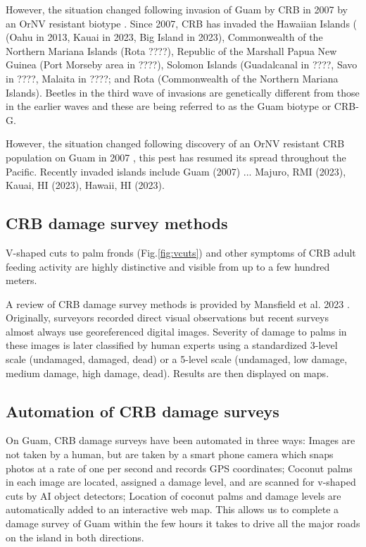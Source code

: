 \documentclass[11pt,english,letterpaper]{scrartcl}
\begin{document}

However, the situation changed following invasion of Guam by CRB in 2007 by an OrNV resistant biotype \cite{Marshall2017}. Since 2007, CRB has invaded the Hawaiian Islands ( (Oahu in 2013, Kauai in 2023, Big Island in 2023), Commonwealth of the Northern Mariana Islands (Rota ????), Republic of the Marshall Papua New Guinea (Port Morseby area in ????), Solomon Islands (Guadalcanal in ????, Savo in ????, Malaita in ????; and Rota (Commonwealth of the Northern Mariana Islands). Beetles in the third wave of invasions are genetically different from those in the earlier waves and these are being referred to as the Guam biotype or CRB-G.



However, the situation changed following discovery of an OrNV resistant CRB population on Guam in 2007 \cite{Marshall2017}, this pest has resumed its spread throughout the Pacific. Recently invaded islands include Guam (2007) ... Majuro, RMI (2023), Kauai, HI (2023), Hawaii, HI (2023).

\subsection{CRB damage survey methods}

V-shaped cuts to palm fronds (Fig.\ref{fig:vcuts}) and other symptoms of CRB adult feeding activity are highly distinctive and visible from up to a few hundred meters.

A review of CRB damage survey methods is provided by Mansfield et al. 2023 \cite{Mansfield2023}. Originally, surveyors recorded direct visual observations but recent surveys almost always use georeferenced digital images. Severity of damage to palms in these images is later classified by human experts using a standardized 3-level scale (undamaged, damaged, dead) or a 5-level scale (undamaged, low damage, medium damage, high damage, dead). Results are then displayed on maps. 

\subsection{Automation of CRB damage surveys}

On Guam, CRB damage surveys have been automated in three ways:
Images are not taken by a human, but are taken by a smart phone camera which snaps photos at a rate of one per second and records GPS coordinates;
Coconut palms in each image are located, assigned a damage level, and are scanned for v-shaped cuts by AI object detectors;
Location of coconut palms and damage levels are automatically added to an interactive web map.
This allows us to complete a damage survey of Guam within the few hours it takes to drive all the major roads on the island in both directions.
\end{document}
